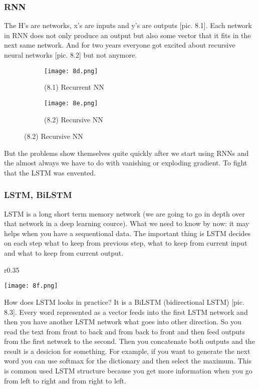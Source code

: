\subsubsection*{RNN}

The H's are networks, x's are inputs and y's are outputs [pic. 8.1]. Each network in RNN does not only produce an output but also some vector that it fits in the next same network. And for two years everyone got excited about recursive neural networks [pic. 8.2] but not anymore.\\
\begin{figure}[h]
  \centering
  \begin{subfigure}[c]{0.5\linewidth}
    \texttt{[image: 8d.png]}
    \caption*{(8.1) Recurrent NN}
  \end{subfigure}
  \hspace{2cm}
  \begin{subfigure}[c]{0.3\linewidth}
    \texttt{[image: 8e.png]}
    \caption*{(8.2) Recursive NN}
  \end{subfigure}
\end{figure}
But the problems show themselves quite quickly after we start using RNNs and the almost always we have to do with vanishing or exploding gradient. {\it <The intuition why it happens>} To fight that the LSTM was envented.

\subsubsection*{LSTM, BiLSTM}

LSTM is a long short term memory network (we are going to go in depth over that network in a deep learning cource). What we need to know by now: it may helps when you have a sequentional data. The important thing is LSTM decides on each step what to keep from previous step, what to keep from current input and what to keep from current output.
\begin{wrapfigure}{r}{0.35\linewidth}
  \vspace{-1.4cm}
  \begin{center}
    \texttt{[image: 8f.png]}
  \end{center}
  \vspace{-0.6cm}
  \caption*{(8.3) BiLSTM}
  \vspace{-0.8cm}
\end{wrapfigure}
How does LSTM looks in practice? It is a BiLSTM (bidirectional LSTM) [pic. 8.3]. Every word represented as a vector feeds into the first LSTM network and then you have another LSTM network what goes into other direction. So you read the text from front to back and from back to front and then feed outputs from the first network to the second. Then you concatenate both outputs and the result is a desicion for something. For example, if you want to generate the next word you can use softmax for the dictionary and then select the maximum. This is common used LSTM structure because you get more information when you go from left to right and from right to left.

